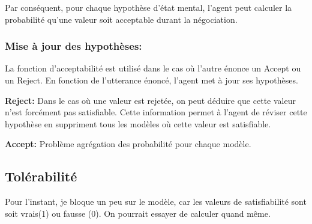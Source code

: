 \documentclass{llncs}
\begin{document}
	Par conséquent, pour chaque hypothèse d'état mental, l'agent peut calculer la probabilité qu'une valeur soit acceptable durant la négociation.
	
	\subsubsection{Mise à jour des hypothèses:}
		La fonction d'acceptabilité est utilisé dans le cas où l'autre énonce un Accept ou un Reject. En fonction de l'utterance énoncé, l'agent met à jour ses hypothèses. 
		
		\textbf{Reject:} Dans le cas où une valeur est rejetée, on peut déduire que cette valeur n'est forcément pas satisfiable. Cette information permet à l'agent de réviser cette hypothèse en suppriment tous les modèles où cette valeur est satisfiable.
		
		\textbf{Accept: } Problème agrégation des probabilité pour chaque modèle.
%	
	\subsection{Tolérabilité}
	Pour l'instant, je bloque un peu sur le modèle, car les valeurs de satisfiabilité sont soit vrais(1) ou fausse (0). 
	On pourrait essayer de calculer quand même.
	
	
\end{document}
